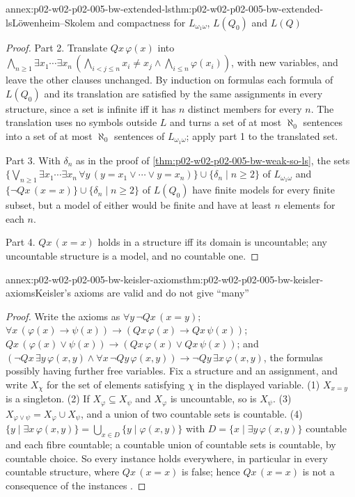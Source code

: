 \begin{annexitem}{annex:p02-w02-p02-005-bw-extended-ls}{thm:p02-w02-p02-005-bw-extended-ls}{L\"owenheim--Skolem and compactness for \(L_{\omega_1\omega}\), \(L(Q_0)\) and \(L(Q)\)}
\begin{proof}
Part 2.  Translate \(Qx\,\varphi(x)\) into
\(\bigwedge_{n\geq1}\exists x_1\cdots\exists x_n\,(\bigwedge_{i<j\leq n}x_i\neq x_j
\land\bigwedge_{i\leq n}\varphi(x_i))\), with new variables, and leave the
other clauses unchanged.  By induction on formulas each formula of
\(L(Q_0)\) and its translation are satisfied by the same assignments in
every structure, since a set is infinite iff it has \(n\) distinct members
for every \(n\).  The translation uses no symbols outside \(L\) and turns
a set of at most \(\aleph_0\) sentences into a set of at most \(\aleph_0\)
sentences of \(L_{\omega_1\omega}\); apply part 1 to the translated set.

Part 3.  With \(\delta_n\) as in the proof of \cref{thm:p02-w02-p02-005-bw-weak-so-ls},
the sets \(\{\bigvee_{n\geq1}\exists x_1\cdots\exists x_n\,\forall y\,
(y=x_1\lor\cdots\lor y=x_n)\}\cup\{\delta_n\mid n\geq2\}\) of
\(L_{\omega_1\omega}\) and \(\{\neg Qx\,(x=x)\}\cup\{\delta_n\mid n\geq2\}\)
of \(L(Q_0)\) have finite models for every finite subset, but a model of
either would be finite and have at least \(n\) elements for each \(n\).

Part 4.  \(Qx\,(x=x)\) holds in a structure iff its domain is uncountable;
any uncountable structure is a model, and no countable one.
\end{proof}
\end{annexitem}

\begin{annexitem}{annex:p02-w02-p02-005-bw-keisler-axioms}{thm:p02-w02-p02-005-bw-keisler-axioms}{Keisler's axioms are valid and do not give ``many''}
\begin{proof}
Write the axioms as \(\forall y\,\neg Qx\,(x=y)\);
\(\forall x\,(\varphi(x)\to\psi(x))\to(Qx\,\varphi(x)\to Qx\,\psi(x))\);
\(Qx\,(\varphi(x)\lor\psi(x))\to(Qx\,\varphi(x)\lor Qx\,\psi(x))\); and
\((\neg Qx\,\exists y\,\varphi(x,y)\land\forall x\,\neg Qy\,\varphi(x,y))\to
\neg Qy\,\exists x\,\varphi(x,y)\), the formulas possibly having further
free variables.  Fix a structure and an assignment, and write
\(X_\chi\) for the set of elements satisfying \(\chi\) in the displayed
variable.  (1) \(X_{x=y}\) is a singleton.  (2) If
\(X_\varphi\subseteq X_\psi\) and \(X_\varphi\) is uncountable, so is
\(X_\psi\).  (3) \(X_{\varphi\lor\psi}=X_\varphi\cup X_\psi\), and a union
of two countable sets is countable.  (4)
\(\{y\mid\exists x\,\varphi(x,y)\}=\bigcup_{x\in D}\{y\mid\varphi(x,y)\}\)
with \(D=\{x\mid\exists y\,\varphi(x,y)\}\) countable and each fibre
countable; a countable union of countable sets is countable, by countable
choice.  So every instance holds everywhere, in particular in every
countable structure, where \(Qx\,(x=x)\) is false; hence \(Qx\,(x=x)\) is
not a consequence of the instances \cite[ch.~A.1, \S5, p.~45]{Barwise1977FirstOrder}.
\end{proof}
\end{annexitem}

